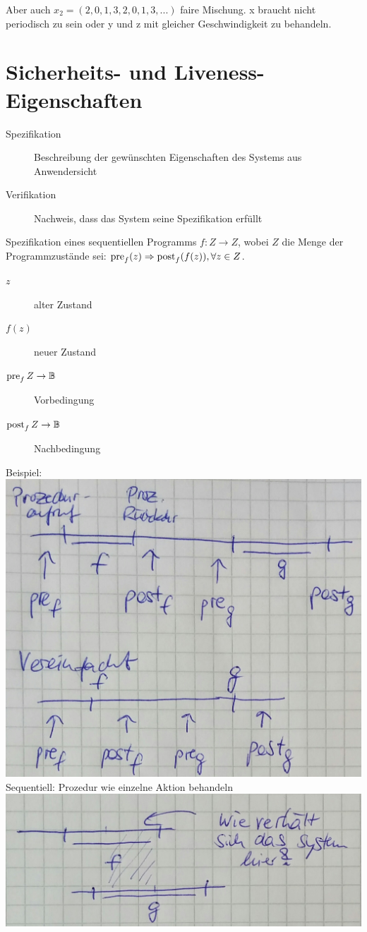Aber auch $x_2 = (2, 0, 1, 3, 2, 0, 1, 3, ...)$ faire Mischung. x braucht nicht periodisch zu sein oder y und z mit gleicher Geschwindigkeit zu behandeln.

\section{Sicherheits- und Liveness-Eigenschaften}
\begin{description}
\item [Spezifikation] Beschreibung der gewünschten Eigenschaften des Systems aus Anwendersicht
\item [Verifikation] Nachweis, dass das System seine Spezifikation erfüllt
\end{description}
Spezifikation eines sequentiellen Programms $f: Z \rightarrow Z$, wobei $Z$ die Menge der Programmzustände sei:
$\operatorname{pre}_f(z) \Rightarrow \operatorname{post}_f(f(z)), \forall z \in Z$.
\begin{description}
\item [$z$] alter Zustand
\item [$f(z)$] neuer Zustand
\item [$\operatorname{pre}_f Z \rightarrow \mathbb{B}$] Vorbedingung
\item [$\operatorname{post}_f Z \rightarrow \mathbb{B}$] Nachbedingung
\end{description}

Beispiel:\\
\includegraphics[width=.6\textwidth]{Verifikation_Zeitstrahl.jpeg}\\
Sequentiell: Prozedur wie einzelne Aktion behandeln\\
\includegraphics[width=.6\textwidth]{Verifikation_Zeitstrahl2.jpeg}\\


